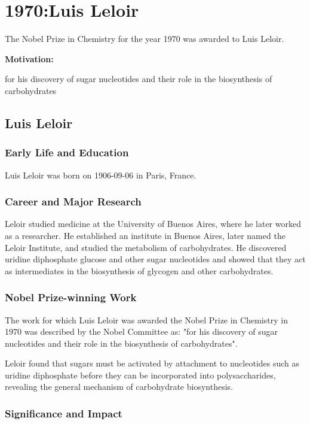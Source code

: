 \chapter{1970:Luis Leloir}

\label{chap:chemistry1970}

The Nobel Prize in Chemistry for the year 1970 was awarded to Luis Leloir.

\textbf{Motivation:}

for his discovery of sugar nucleotides and their role in the biosynthesis of carbohydrates

\section{Luis Leloir}

\subsection*{Early Life and Education}

Luis Leloir was born on 1906-09-06 in Paris, France.

\subsection*{Career and Major Research}

Leloir studied medicine at the University of Buenos Aires, where he later worked as a researcher. He established an institute in Buenos Aires, later named the Leloir Institute, and studied the metabolism of carbohydrates. He discovered uridine diphosphate glucose and other sugar nucleotides and showed that they act as intermediates in the biosynthesis of glycogen and other carbohydrates.

\subsection*{Nobel Prize-winning Work}

The work for which Luis Leloir was awarded the Nobel Prize in Chemistry in 1970 was described by the Nobel Committee as: "for his discovery of sugar nucleotides and their role in the biosynthesis of carbohydrates".

Leloir found that sugars must be activated by attachment to nucleotides such as uridine diphosphate before they can be incorporated into polysaccharides, revealing the general mechanism of carbohydrate biosynthesis.

\subsection*{Significance and Impact}

